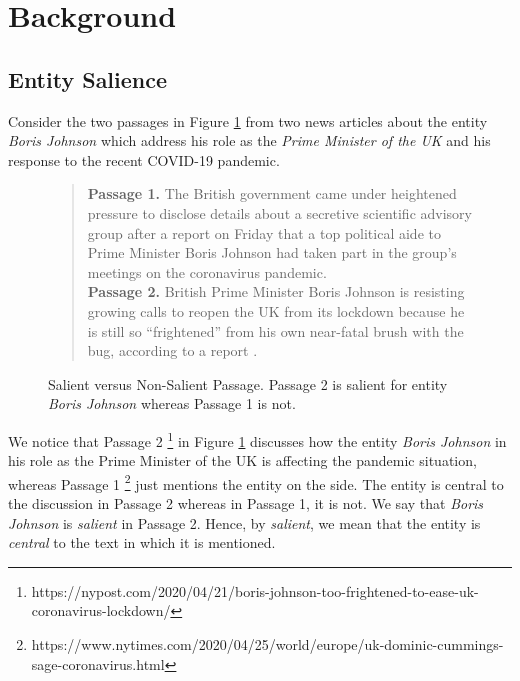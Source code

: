 \section{Background}
\label{sec:Background}



\subsection{Entity Salience}
\label{subsec:Entity Salience}
Consider the two passages in Figure \ref{fig:Salience} from two news articles about the entity \textit{Boris Johnson} which address his role as the \textit{Prime Minister of the UK} and his response to the recent COVID-19 pandemic.
\begin{figure}[t]
    \centering
   \begin{quote}
\textbf{Passage 1.} The British government came under heightened pressure to disclose details about a secretive scientific advisory group after a report on Friday that a top political aide to Prime Minister Boris Johnson had taken part in the group’s meetings on the coronavirus pandemic. \\
\textbf{Passage 2.} British Prime Minister Boris Johnson is resisting growing calls to reopen the UK from its lockdown because he is still so “frightened” from his own near-fatal brush with the bug, according to a report .
\end{quote}
    \caption{Salient versus Non-Salient Passage. Passage 2 is salient for entity \textit{Boris Johnson} whereas Passage 1 is not.}
    \label{fig:Salience}
\end{figure}
We notice that Passage 2 \footnote{https://nypost.com/2020/04/21/boris-johnson-too-frightened-to-ease-uk-coronavirus-lockdown/} in Figure \ref{fig:Salience} discusses how the entity \textit{Boris Johnson} in his role as the Prime Minister of the UK is affecting the pandemic situation, whereas Passage 1 \footnote{https://www.nytimes.com/2020/04/25/world/europe/uk-dominic-cummings-sage-coronavirus.html} just mentions the entity on the side. The entity is central to the discussion in Passage 2 whereas in Passage 1, it is not. We say that \textit{Boris Johnson} is \textit{salient} in Passage 2. Hence, by \textit{salient}, we mean that the entity is \textit{central} to the text in which it is mentioned. 


